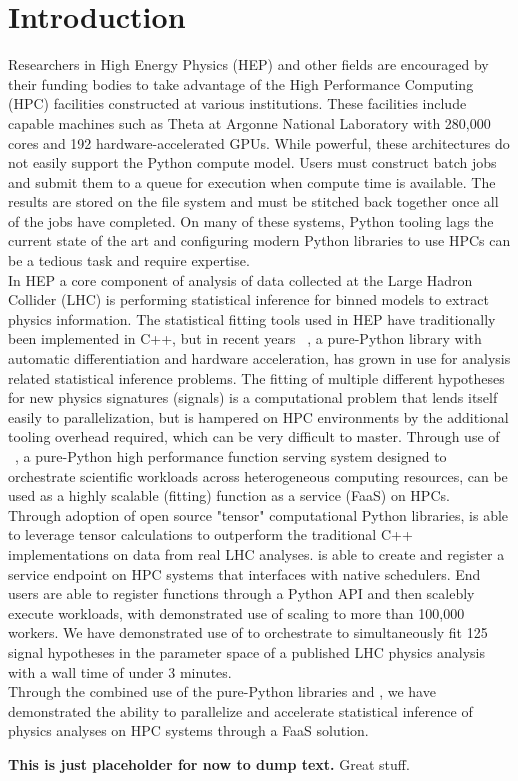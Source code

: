 \section{Introduction}\label{sec:introduction}

Researchers in High Energy Physics (HEP) and other fields are encouraged by their funding bodies to take advantage of the High Performance Computing (HPC) facilities constructed at various institutions.
These facilities include capable machines such as Theta at Argonne National Laboratory with 280,000 cores and 192 hardware-accelerated GPUs.
While powerful, these architectures do not easily support the Python compute model.
Users must construct batch jobs and submit them to a queue for execution when compute time is available.
The results are stored on the file system and must be stitched back together once all of the jobs have completed.
On many of these systems, Python tooling lags the current state of the art and configuring modern Python libraries to use HPCs can be a tedious task and require expertise.\\

In HEP a core component of analysis of data collected at the Large Hadron Collider (LHC) is performing statistical inference for binned models to extract physics information.
The statistical fitting tools used in HEP have traditionally been implemented in C++, but in recent years \pyhf{}~\cite{pyhf,pyhf_joss}, a pure-Python library with automatic differentiation and hardware acceleration, has grown in use for analysis related statistical inference problems.
The fitting of multiple different hypotheses for new physics signatures (signals) is a computational problem that lends itself easily to parallelization, but is hampered on HPC environments by the additional tooling overhead required, which can be very difficult to master.
Through use of \funcX{}~\cite{funcX_paper}, a pure-Python high performance function serving system designed to orchestrate scientific workloads across heterogeneous computing resources, \pyhf{} can be used as a highly scalable (fitting) function as a service (FaaS) on HPCs.\\

Through adoption of open source "tensor" computational Python libraries, \pyhf{} is able to leverage tensor calculations to outperform the traditional C++ implementations on data from real LHC analyses.
\funcX{} is able to create and register a service endpoint on HPC systems that interfaces with native schedulers.
End users are able to register functions through a Python API and then scalebly execute workloads, with demonstrated use of scaling to more than 100,000 workers.
We have demonstrated use of \funcX{} to orchestrate \pyhf{} to simultaneously fit 125 signal hypotheses in the parameter space of a published LHC physics analysis with a wall time of under 3 minutes.\\

Through the combined use of the pure-Python libraries \funcX{} and \pyhf{}, we have demonstrated the ability to parallelize and accelerate statistical inference of physics analyses on HPC systems through a FaaS solution.

\textbf{This is just placeholder for now to dump text.}
Great stuff.~\cite{ATL-PHYS-PUB-2019-029}
